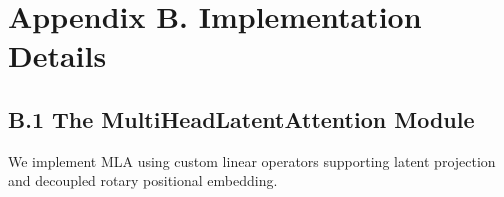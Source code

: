 \section{Appendix B. Implementation Details}
\subsection{B.1 The MultiHeadLatentAttention Module}
We implement MLA using custom linear operators supporting latent projection and decoupled rotary positional embedding.
